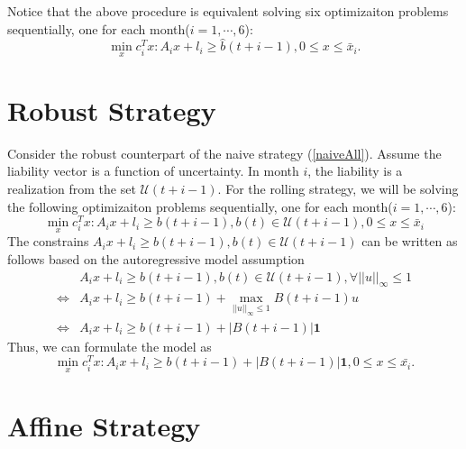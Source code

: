     Notice that the above procedure is equivalent solving six optimizaiton problems sequentially, one for each month($i = 1, \cdots, 6$):
    \begin{equation}\label{naiveAll}
        \min_x c_i^Tx: A_ix+l_i\geq\hat{b}(t+i-1), 0\leq x\leq \bar{x}_i.
    \end{equation}

\section{Robust Strategy}

    Consider the robust counterpart of the naive strategy (\ref{naiveAll}). Assume the liability vector is a function of uncertainty. In month $i$, the liability is a realization from the set $\mathcal{U}(t+i-1)$. For the rolling strategy, we will be solving the following optimizaiton problems sequentially, one for each month($i = 1, \cdots, 6$):
    \begin{equation}\label{eq:robust}
       \min_x c_i^Tx: A_ix+l_i\geq b(t+i-1), b(t)\in\mathcal{U}(t+i-1) ,0\leq x\leq \bar{x}_i
    \end{equation}
    The constrains $A_ix+l_i\geq b(t+i-1), b(t)\in\mathcal{U}(t+i-1)$ can be written as follows based on the autoregressive model assumption
    \[\begin{split}
        & A_ix+l_i\geq b(t+i-1), b(t)\in\mathcal{U}(t+i-1), \forall ||u||_\infty \leq 1 \\
        \iff & A_ix+l_i\geq b(t+i-1) + \max_{||u||_\infty \leq 1}B(t+i-1)u \\
        \iff & A_ix+l_i\geq b(t+i-1) + |B(t+i-1)|\textbf{1}
    \end{split}\]
    Thus, we can formulate the model as
    \begin{equation}\label{eq:robust_final}
        \min_x c_i^Tx: A_ix+l_i\geq b(t+i-1)+|B(t+i-1)|\textbf{1}, 0\leq x\leq \bar{x_i}.
    \end{equation}

\section{Affine Strategy}

